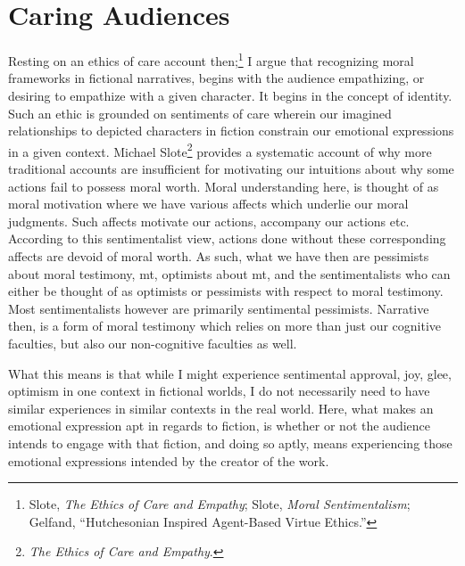 \documentclass[phdthesis,12pt,final]{wuthesis}
\theoremstyle{definition}
\theoremstyle{definition}
\theoremstyle{definition}
\theoremstyle{definition}
\theoremstyle{remark}
\begin{document}
\section{Caring Audiences}\label{caring-audiences}

Resting on an ethics of care account then;\footnote{Slote, \emph{The {Ethics} of {Care} and {Empathy}}; Slote, \emph{Moral {Sentimentalism}}; Gelfand, {``Hutchesonian Inspired Agent-Based Virtue Ethics.''}} I argue that recognizing moral frameworks in fictional narratives, begins with the audience empathizing, or desiring to empathize with a given character. It begins in the concept of identity. Such an ethic is grounded on sentiments of care wherein our imagined relationships to depicted characters in fiction constrain our emotional expressions in a given context. Michael Slote\footnote{\emph{The {Ethics} of {Care} and {Empathy}}.} provides a systematic account of why more traditional accounts are insufficient for motivating our intuitions about why some actions fail to possess moral worth. Moral understanding here, is thought of as moral motivation where we have various affects which underlie our moral judgments. Such affects motivate our actions, accompany our actions etc. According to this sentimentalist view, actions done without these corresponding affects are devoid of moral worth. As such, what we have then are pessimists about moral testimony, mt, optimists about mt, and the sentimentalists who can either be thought of as optimists or pessimists with respect to moral testimony. Most sentimentalists however are primarily sentimental pessimists. Narrative then, is a form of moral testimony which relies on more than just our cognitive faculties, but also our non-cognitive faculties as well.

What this means is that while I might experience sentimental approval, joy, glee, optimism in one context in fictional worlds, I do not necessarily need to have similar experiences in similar contexts in the real world. Here, what makes an emotional expression apt in regards to fiction, is whether or not the audience intends to engage with that fiction, and doing so aptly, means experiencing those emotional expressions intended by the creator of the work.
\end{document}
